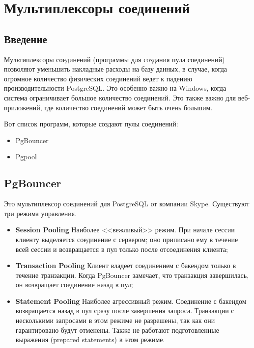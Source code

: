 \chapter{Мультиплексоры соединений}

\begin{epigraphs}
\end{epigraphs}

\section{Введение}

Мультиплексоры соединений (программы для создания пула соединений) позволяют уменьшить накладные расходы на базу данных, в случае, когда огромное количество физических соединений ведет к падению производительности PostgreSQL. Это особенно важно на Windows, когда система ограничивает большое количество соединений. Это также важно для веб-приложений, где количество соединений может быть очень большим.

Вот список программ, которые создают пулы соединений:

\begin{itemize}
  \item PgBouncer
  \item Pgpool
\end{itemize}

\section{PgBouncer}

Это мультиплексор соединений для PostgreSQL от компании Skype. Существуют три режима управления.

\begin{itemize}
  \item \textbf{Session Pooling} Наиболее <<вежливый>> режим. При начале сессии клиенту выделяется соединение с сервером; оно приписано ему в течение всей сессии и возвращается в пул только после отсоединения клиента;
  \item \textbf{Transaction Pooling} Клиент владеет соединением с бакендом только в течение транзакции. Когда PgBouncer замечает, что транзакция завершилась, он возвращает соединение назад в пул;
  \item \textbf{Statement Pooling} Наиболее агрессивный режим. Соединение с бакендом возвращается назад в пул сразу после завершения запроса. Транзакции с несколькими запросами в этом режиме не разрешены, так как они гарантировано будут отменены. Также не работают подготовленные выражения (prepared statements) в этом режиме.
\end{itemize}

